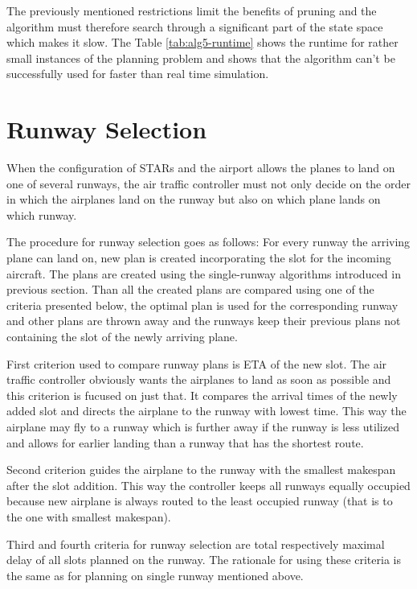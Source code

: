 The previously mentioned restrictions limit the benefits of pruning and the algorithm must therefore search through a significant part of the state space which makes it slow. The Table \ref{tab:alg5-runtime} shows the runtime for rather small instances of the planning problem and shows that the algorithm can't be successfully used for faster than real time simulation.

\section{Runway Selection}

\label{section:runway-selection}

When the configuration of STARs and the airport allows the planes to land on one of several runways, the air traffic controller must not only decide on the order in which the airplanes land on the runway but also on which plane lands on which runway.

The procedure for runway selection goes as follows: For every runway the arriving plane can land on, new plan is created incorporating the slot for the incoming aircraft. The plans are created using the single-runway algorithms introduced in previous section. Than all the created plans are compared using one of the criteria presented below, the optimal plan is used for the corresponding runway and other plans are thrown away and the runways keep their previous plans not containing the slot of the newly arriving plane.

First criterion used to compare runway plans is ETA of the new slot. The air traffic controller obviously wants the airplanes to land as soon as possible and this criterion is fucused on just that. It compares the arrival times of the newly added slot and directs the airplane to the runway with lowest time. This way the airplane may fly to a runway which is further away if the runway is less utilized and allows for earlier landing than a runway that has the shortest route.

Second criterion guides the airplane to the runway with the smallest makespan after the slot addition. This way the controller keeps all runways equally occupied because new airplane is always routed to the least occupied runway (that is to the one with smallest makespan).

Third and fourth criteria for runway selection are total respectively maximal delay of all slots planned on the runway. The rationale for using these criteria is the same as for planning on single runway mentioned above.
